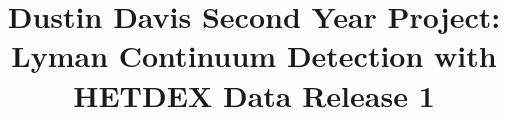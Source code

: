 \documentclass{aastex62}
\begin{document}
\title{Dustin Davis Second Year Project: Lyman Continuum Detection with HETDEX Data Release 1}


\end{document}
